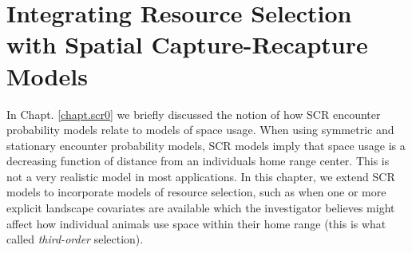 \chapter{
Integrating Resource Selection
with
Spatial Capture-Recapture
Models}

\label{chapt.rsf}

\vspace{.3in}

In Chapt. \ref{chapt.scr0} we briefly discussed the notion of how
SCR encounter probability models relate to models of space usage.
When using symmetric and stationary encounter probability models, SCR
models imply that space usage is a decreasing function of distance
from an individuals home range center. This is not a very realistic
model in most applications.  In this chapter, we extend SCR
models to incorporate models of resource selection,
such as when
one or more explicit landscape covariates are available which the
investigator believes might affect how individual animals use space
within their home range (this is what \citet{johnson:1980} called {\it
  third-order} selection).  
  
  

